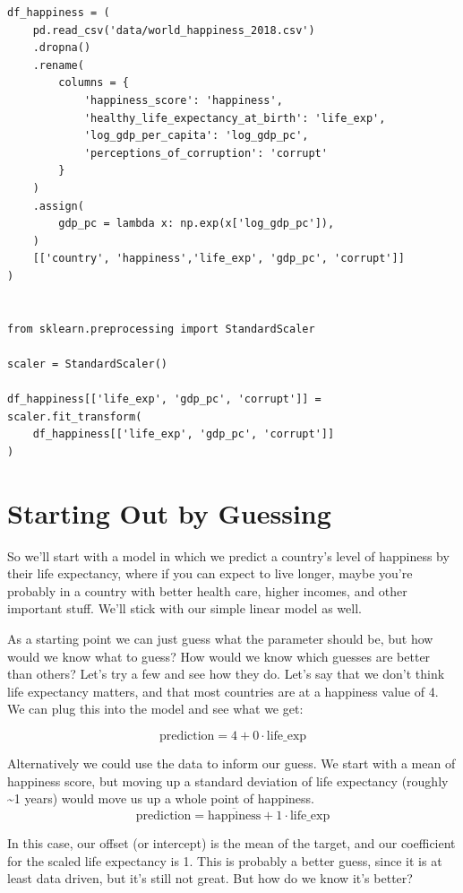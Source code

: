 \documentclass[
  letterpaper,
]{krantz}
\begin{document}
\begin{verbatim}
df_happiness = (
    pd.read_csv('data/world_happiness_2018.csv')
    .dropna()
    .rename(
        columns = {
            'happiness_score': 'happiness',
            'healthy_life_expectancy_at_birth': 'life_exp',
            'log_gdp_per_capita': 'log_gdp_pc',
            'perceptions_of_corruption': 'corrupt'
        }
    )
    .assign(
        gdp_pc = lambda x: np.exp(x['log_gdp_pc']),
    )    
    [['country', 'happiness','life_exp', 'gdp_pc', 'corrupt']]
)


from sklearn.preprocessing import StandardScaler

scaler = StandardScaler()

df_happiness[['life_exp', 'gdp_pc', 'corrupt']] = scaler.fit_transform(
    df_happiness[['life_exp', 'gdp_pc', 'corrupt']]
)
\end{verbatim}

\section{Starting Out by Guessing}\label{sec-estim-guessing}

So we'll start with a model in which we predict a country's level of
happiness by their life expectancy, where if you can expect to live
longer, maybe you're probably in a country with better health care,
higher incomes, and other important stuff. We'll stick with our simple
linear model as well.

As a starting point we can just guess what the parameter should be, but
how would we know what to guess? How would we know which guesses are
better than others? Let's try a few and see how they do. Let's say that
we don't think life expectancy matters, and that most countries are at a
happiness value of 4. We can plug this into the model and see what we
get:

\[
\textrm{prediction} = 4 + 0\cdot\textrm{life\_exp}
\]

Alternatively we could use the data to inform our guess. We start with a
mean of happiness score, but moving up a standard deviation of life
expectancy (roughly \textasciitilde1 years) would move us up a whole
point of happiness. \[
\textrm{prediction} = \overline{\textrm{happiness}} + 1\cdot\textrm{life\_exp}
\]

In this case, our offset (or intercept) is the mean of the target, and
our coefficient for the scaled life expectancy is 1. This is probably a
better guess, since it is at least data driven, but it's still not
great. But how do we know it's better?
\end{document}
